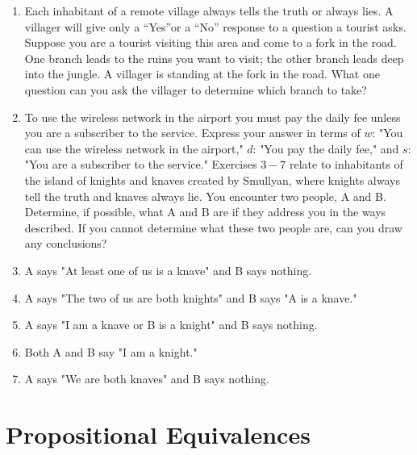 \documentclass{sig-alternate-05-2015}
\begin{document}
\begin{enumerate}
\item Each inhabitant of a remote village always tells the truth
or always lies. A villager will give only a \textquotedblleft Yes\textquotedblright or a \textquotedblleft No\textquotedblright
response to a question a tourist asks. Suppose you are a
tourist visiting this area and come to a fork in the road.
One branch leads to the ruins you want to visit; the other
branch leads deep into the jungle. A villager is standing
at the fork in the road. What one question can you ask the
villager to determine which branch to take?

\item To use the wireless network in the airport you must pay
the daily fee unless you are a subscriber to the service.
Express your answer in terms of $w$: "You can use the wireless
network in the airport," $d$: "You pay the daily fee,"
and $s$: "You are a subscriber to the service."
\newline\newline
Exercises $3 - 7$ relate to inhabitants of the island of knights
and knaves created by Smullyan, where knights always tell
the truth and knaves always lie. You encounter two people,
A and B. Determine, if possible, what A and B are if they
address you in the ways described. If you cannot determine
what these two people are, can you draw any conclusions?

\item A says "At least one of us is a knave" and B says nothing.
\item A says "The two of us are both knights" and B says "A
is a knave."
\item A says "I am a knave or B is a knight" and B says nothing.
\item Both A and B say "I am a knight."
\item A says "We are both knaves" and B says nothing.

\end{enumerate}

\section{Propositional Equivalences}
\end{document}
